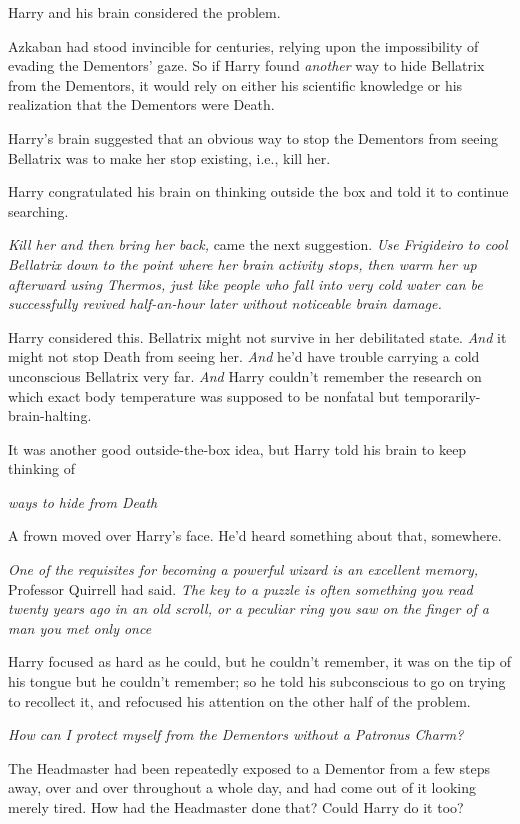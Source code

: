 Harry and his brain considered the problem.

Azkaban had stood invincible for centuries, relying upon the impossibility of
evading the Dementors' gaze. So if Harry found \emph{another} way to hide
Bellatrix from the Dementors, it would rely on either his scientific knowledge
or his realization that the Dementors were Death.

Harry's brain suggested that an obvious way to stop the Dementors from seeing
Bellatrix was to make her stop existing, i.e., kill her.

Harry congratulated his brain on thinking outside the box and told it to
continue searching.

\emph{Kill her and then bring her back,} came the next suggestion. \emph{Use
Frigideiro to cool Bellatrix down to the point where her brain activity stops,
then warm her up afterward using Thermos, just like people who fall into very
cold water can be successfully revived half-an-hour later without noticeable
brain damage.}

Harry considered this. Bellatrix might not survive in her debilitated state.
\emph{And} it might not stop Death from seeing her. \emph{And} he'd have
trouble carrying a cold unconscious Bellatrix very far. \emph{And} Harry
couldn't remember the research on which exact body temperature was supposed to
be nonfatal but temporarily-brain-halting.

It was another good outside-the-box idea, but Harry told his brain to keep
thinking of{\el}

\emph{{\el}ways to hide from Death{\el}}

A frown moved over Harry's face. He'd heard something about that, somewhere.

\emph{One of the requisites for becoming a powerful wizard is an excellent
memory,} Professor Quirrell had said. \emph{The key to a puzzle is often
something you read twenty years ago in an old scroll, or a peculiar ring you
saw on the finger of a man you met only once{\el}}

Harry focused as hard as he could, but he couldn't remember, it was on the tip
of his tongue but he couldn't remember; so he told his subconscious to go on
trying to recollect it, and refocused his attention on the other half of the
problem.

\emph{How can I protect myself from the Dementors without a Patronus Charm?}

The Headmaster had been repeatedly exposed to a Dementor from a few steps away,
over and over throughout a whole day, and had come out of it looking merely
tired. How had the Headmaster done that? Could Harry do it too?


